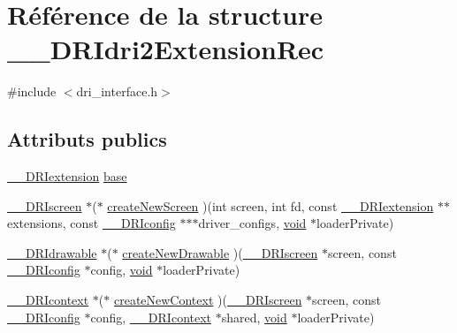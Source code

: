 \hypertarget{struct_____d_r_idri2_extension_rec}{\section{Référence de la structure \-\_\-\-\_\-\-D\-R\-Idri2\-Extension\-Rec}
\label{struct_____d_r_idri2_extension_rec}
}


{\ttfamily \#include $<$dri\-\_\-interface.\-h$>$}

\subsection*{Attributs publics}
\begin{DoxyCompactItemize}
\item 
\hyperlink{dri__interface_8h_a4e0a61c8ece00d2b2c6792a9a1b55385}{\-\_\-\-\_\-\-D\-R\-Iextension} \hyperlink{struct_____d_r_idri2_extension_rec_a71675244c4518f1cd35041acd4836135}{base}
\item 
\hyperlink{dri__interface_8h_a9961b01d421ee1fd6ed3c05acc9ca561}{\-\_\-\-\_\-\-D\-R\-Iscreen} $\ast$($\ast$ \hyperlink{struct_____d_r_idri2_extension_rec_a5a8c3013e807ff95b7f1b356a0ede411}{create\-New\-Screen} )(int screen, int fd, const \hyperlink{dri__interface_8h_a4e0a61c8ece00d2b2c6792a9a1b55385}{\-\_\-\-\_\-\-D\-R\-Iextension} $\ast$$\ast$extensions, const \hyperlink{dri__interface_8h_aeac81999efbbf8b1d6886338e3ea24d9}{\-\_\-\-\_\-\-D\-R\-Iconfig} $\ast$$\ast$$\ast$driver\-\_\-configs, \hyperlink{glu_8h_a4292190e3f1f6b373a760c7d9316ad3c}{void} $\ast$loader\-Private)
\item 
\hyperlink{dri__interface_8h_a5bfb832a0a08208d95b3bbef439d2262}{\-\_\-\-\_\-\-D\-R\-Idrawable} $\ast$($\ast$ \hyperlink{struct_____d_r_idri2_extension_rec_ad8dee7e9945357051c9fe893d34f06fe}{create\-New\-Drawable} )(\hyperlink{dri__interface_8h_a9961b01d421ee1fd6ed3c05acc9ca561}{\-\_\-\-\_\-\-D\-R\-Iscreen} $\ast$screen, const \hyperlink{dri__interface_8h_aeac81999efbbf8b1d6886338e3ea24d9}{\-\_\-\-\_\-\-D\-R\-Iconfig} $\ast$config, \hyperlink{glu_8h_a4292190e3f1f6b373a760c7d9316ad3c}{void} $\ast$loader\-Private)
\item 
\hyperlink{dri__interface_8h_a3fd295cba82b5a3d79f1ee7e12bfb908}{\-\_\-\-\_\-\-D\-R\-Icontext} $\ast$($\ast$ \hyperlink{struct_____d_r_idri2_extension_rec_a1c53d4e7d5aa4e7e757173bf52494878}{create\-New\-Context} )(\hyperlink{dri__interface_8h_a9961b01d421ee1fd6ed3c05acc9ca561}{\-\_\-\-\_\-\-D\-R\-Iscreen} $\ast$screen, const \hyperlink{dri__interface_8h_aeac81999efbbf8b1d6886338e3ea24d9}{\-\_\-\-\_\-\-D\-R\-Iconfig} $\ast$config, \hyperlink{dri__interface_8h_a3fd295cba82b5a3d79f1ee7e12bfb908}{\-\_\-\-\_\-\-D\-R\-Icontext} $\ast$shared, \hyperlink{glu_8h_a4292190e3f1f6b373a760c7d9316ad3c}{void} $\ast$loader\-Private)
$$
\end{DoxyCompactItemize}
